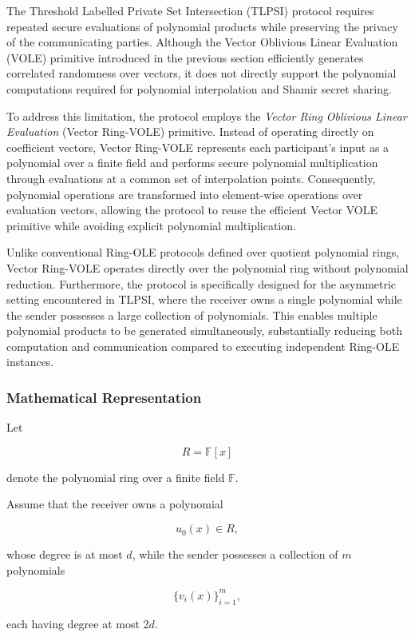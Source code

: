 \documentclass[11pt,a4paper]{article}
\begin{document}
The Threshold Labelled Private Set Intersection (TLPSI) protocol requires repeated secure evaluations of
polynomial products while preserving the privacy of the communicating parties. Although the Vector
Oblivious Linear Evaluation (VOLE) primitive introduced in the previous section efficiently generates
correlated randomness over vectors, it does not directly support the polynomial computations required for
polynomial interpolation and Shamir secret sharing.

To address this limitation, the protocol employs the \emph{Vector Ring Oblivious Linear Evaluation}
(Vector Ring-VOLE) primitive. Instead of operating directly on coefficient vectors, Vector Ring-VOLE
represents each participant's input as a polynomial over a finite field and performs secure polynomial
multiplication through evaluations at a common set of interpolation points. Consequently, polynomial
operations are transformed into element-wise operations over evaluation vectors, allowing the protocol to
reuse the efficient Vector VOLE primitive while avoiding explicit polynomial multiplication.

Unlike conventional Ring-OLE protocols defined over quotient polynomial rings, Vector Ring-VOLE
operates directly over the polynomial ring without polynomial reduction. Furthermore, the protocol is
specifically designed for the asymmetric setting encountered in TLPSI, where the receiver owns a single
polynomial while the sender possesses a large collection of polynomials. This enables multiple polynomial
products to be generated simultaneously, substantially reducing both computation and communication
compared to executing independent Ring-OLE instances.



\subsubsection{Mathematical Representation}

Let

\[
R=\mathbb{F}[x]
\]

denote the polynomial ring over a finite field $\mathbb{F}$.

Assume that the receiver owns a polynomial

\[
u_0(x)\in R,
\]

whose degree is at most $d$, while the sender possesses a collection of $m$ polynomials

\[
\{v_i(x)\}_{i=1}^{m},
\]

each having degree at most $2d$.
\end{document}
